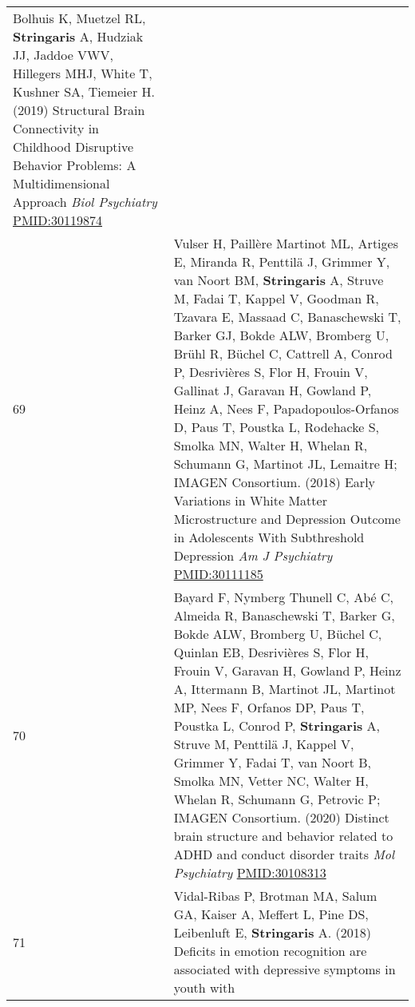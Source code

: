 \documentclass[
]{article}
\begin{document}
\begin{longtable}[]{@{}ll@{}}
\begin{minipage}[t]{0.94\columnwidth}
Bolhuis K, Muetzel RL, \textbf{Stringaris} A, Hudziak JJ, Jaddoe VWV,
Hillegers MHJ, White T, Kushner SA, Tiemeier H. (2019) Structural Brain
Connectivity in Childhood Disruptive Behavior Problems: A
Multidimensional Approach \emph{Biol Psychiatry}
\url{PMID:30119874}\strut
\end{minipage}\tabularnewline
\begin{minipage}[t]{0.01\columnwidth}\raggedright
69\strut
\end{minipage} & \begin{minipage}[t]{0.94\columnwidth}\raggedright
Vulser H, Paillère Martinot ML, Artiges E, Miranda R, Penttilä J,
Grimmer Y, van Noort BM, \textbf{Stringaris} A, Struve M, Fadai T,
Kappel V, Goodman R, Tzavara E, Massaad C, Banaschewski T, Barker GJ,
Bokde ALW, Bromberg U, Brühl R, Büchel C, Cattrell A, Conrod P,
Desrivières S, Flor H, Frouin V, Gallinat J, Garavan H, Gowland P, Heinz
A, Nees F, Papadopoulos-Orfanos D, Paus T, Poustka L, Rodehacke S,
Smolka MN, Walter H, Whelan R, Schumann G, Martinot JL, Lemaitre H;
IMAGEN Consortium. (2018) Early Variations in White Matter
Microstructure and Depression Outcome in Adolescents With Subthreshold
Depression \emph{Am J Psychiatry} \url{PMID:30111185}\strut
\end{minipage}\tabularnewline
\begin{minipage}[t]{0.01\columnwidth}\raggedright
70\strut
\end{minipage} & \begin{minipage}[t]{0.94\columnwidth}\raggedright
Bayard F, Nymberg Thunell C, Abé C, Almeida R, Banaschewski T, Barker G,
Bokde ALW, Bromberg U, Büchel C, Quinlan EB, Desrivières S, Flor H,
Frouin V, Garavan H, Gowland P, Heinz A, Ittermann B, Martinot JL,
Martinot MP, Nees F, Orfanos DP, Paus T, Poustka L, Conrod P,
\textbf{Stringaris} A, Struve M, Penttilä J, Kappel V, Grimmer Y, Fadai
T, van Noort B, Smolka MN, Vetter NC, Walter H, Whelan R, Schumann G,
Petrovic P; IMAGEN Consortium. (2020) Distinct brain structure and
behavior related to ADHD and conduct disorder traits \emph{Mol
Psychiatry} \url{PMID:30108313}\strut
\end{minipage}\tabularnewline
\begin{minipage}[t]{0.01\columnwidth}\raggedright
71\strut
\end{minipage} & \begin{minipage}[t]{0.94\columnwidth}\raggedright
Vidal-Ribas P, Brotman MA, Salum GA, Kaiser A, Meffert L, Pine DS,
Leibenluft E, \textbf{Stringaris} A. (2018) Deficits in emotion
recognition are associated with depressive symptoms in youth with

\end{minipage}
\end{longtable}
\end{document}

